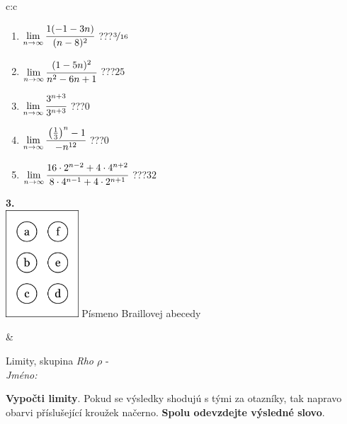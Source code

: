 \documentclass[10pt]{report}
\begin{document}
\begin{tabular}{c:c}
\begin{minipage}[c][104.5mm][t]{0.5\linewidth}
\begin{center}
\begin{minipage}{0.79\linewidth}
\begin{center}
\begin{varwidth}{\linewidth}
\begin{enumerate}
\item $\lim\limits_{n\to\infty}\cfrac{1(-1-3n)}{(n-8)^2}$\quad \dotfill\; ???\;\dotfill \quad $\nicefrac{3}{16}$
\item $\lim\limits_{n\to\infty}\cfrac{(1-5n)^2}{n^2-6n+1}$\quad \dotfill\; ???\;\dotfill \quad $25$
\item $\lim\limits_{n\to\infty}\cfrac{3^{n+3}}{3^{n+3}}$\quad \dotfill\; ???\;\dotfill \quad $0$
\item $\lim\limits_{n\to\infty}\cfrac{\left(\frac{1}{3}\right)^n -1}{-n^{12}}$\quad \dotfill\; ???\;\dotfill \quad $0$
\item $\lim\limits_{n\to\infty}\cfrac{16\cdot 2^{n-2}+4\cdot 4^{n+2}}{8\cdot 4^{n-1}+4\cdot 2^{n+1}}$\quad \dotfill\; ???\;\dotfill \quad $32$
\end{enumerate}
\end{varwidth}
\end{center}
\end{minipage}
\begin{minipage}{0.20\linewidth}
\begin{center}
{\Huge\bfseries 3.} \\[2mm]
\includegraphics[height=40mm]{../images/braille.png}
{\small Písmeno Braillovej abecedy}
\end{center}
\end{minipage}
\end{center}
\end{minipage}
&
\begin{minipage}[c][104.5mm][t]{0.5\linewidth}
\begin{center}
\vspace{7mm}
{\huge Limity, skupina \textit{Rho $\rho$} -}\\[5mm]
\textit{Jméno:}\phantom{xxxxxxxxxxxxxxxxxxxxxxxxxxxxxxxxxxxxxxxxxxxxxxxxxxxxxxxxxxxxxxxxx}\\[5mm]
\begin{minipage}{0.95\linewidth}
\begin{center}
\textbf{Vypočti limity}. Pokud se výsledky shodujú s tými za otazníky, tak napravo\\obarvi příslušející kroužek načerno. \textbf{Spolu odevzdejte výsledné slovo}.

\end{center}
\end{minipage}
\end{center}
\end{minipage}
\end{tabular}
\end{document}
